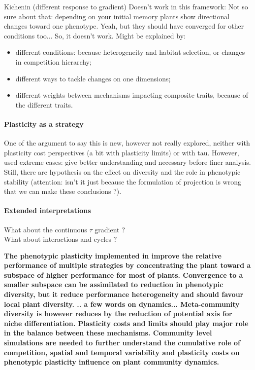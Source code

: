 Kichenin (different response to gradient) Doesn't work in this framework: Not so sure about that: depending on your initial memory plants show directional changes toward one phenotype. Yeah, but they should have converged for other conditions too... So, it doesn't work. Might be explained by:
\begin{itemize}
\item different conditions: because heterogeneity and habitat selection, or changes in competition hierarchy;
\item different ways to tackle changes on one dimensions;
\item different weights between mechanisms impacting composite traits, because of the different traits.
\end{itemize}


\paragraph{Plasticity as a strategy}
One of the argument to say this is new, however not really explored, neither with plasticity cost perspectives (a bit with plasticity limits) or with tau. However, used extreme cases: give better understanding and necessary before finer analysis. Still, there are hypothesis on the effect on diversity and the role in phenotypic stability (attention: isn't it just because the formulation of projection is wrong that we can make these conclusions ?).



\paragraph{Extended interpretations}
What about the continuous $\tau$ gradient ?\\
What about interactions and cycles ?



\textbf{The phenotypic plasticity implemented in \model improve the relative performance of multiple strategies by concentrating the plant toward a subspace of higher performance for most of plants. Convergence to a smaller subspace can be assimilated to reduction in phenotypic diversity, but it reduce performance heterogeneity and should favour local plant diversity. .. a few words on dynamics... Meta-community diversity is however reduces by the reduction of potential axis for niche differentiation. Plasticity costs and limits should play major role in the balance between these mechanisms. Community level simulations are needed to further understand the cumulative role of competition, spatial and temporal variability and plasticity costs on phenotypic plasticity influence on plant community dynamics.}


